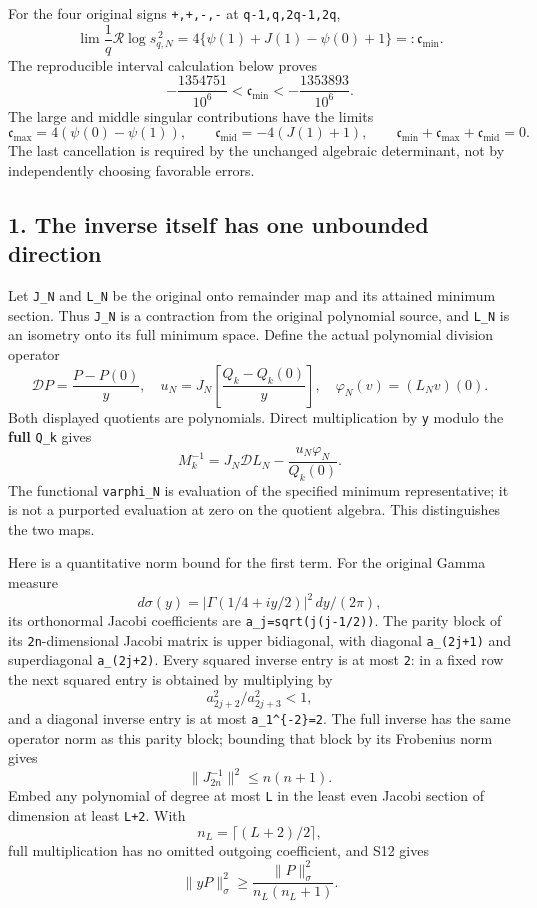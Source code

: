 \documentclass[11pt]{article}
\begin{document}
For the four original signs \texttt{+,+,-,-} at \texttt{q-1,q,2q-1,2q}, \[
 \boxed{\lim\frac1q\mathcal R\log s_{q,N}^{\,2}
 =4\{\psi(1)+J(1)-\psi(0)+1\}=:\mathfrak c_{\min}.}                 \tag{S8}
\] The reproducible interval calculation below proves \[
 -\frac{1354751}{10^6}<\mathfrak c_{\min}
 < -\frac{1353893}{10^6}.                                          \tag{S9}
\] The large and middle singular contributions have the limits \[
 \mathfrak c_{\max}=4(\psi(0)-\psi(1)),\qquad
 \mathfrak c_{\mathrm{mid}}=-4(J(1)+1),\qquad
 \mathfrak c_{\min}+\mathfrak c_{\max}+\mathfrak c_{\mathrm{mid}}=0.   \tag{S10}
\] The last cancellation is required by the unchanged algebraic determinant, not by independently choosing favorable errors.

\subsection{1. The inverse itself has one unbounded direction}\label{the-inverse-itself-has-one-unbounded-direction}

Let \texttt{J\_N} and \texttt{L\_N} be the original onto remainder map and its attained minimum section. Thus \texttt{J\_N} is a contraction from the original polynomial source, and \texttt{L\_N} is an isometry onto its full minimum space. Define the actual polynomial division operator \[
 \mathscr D P=\frac{P-P(0)}y,
 \quad u_N=J_N\left[\frac{Q_k-Q_k(0)}y\right],\quad
 \varphi_N(v)=(L_Nv)(0).
\] Both displayed quotients are polynomials. Direct multiplication by \texttt{y} modulo the \textbf{full} \texttt{Q\_k} gives \[
 \boxed{M_k^{-1}=J_N\mathscr D L_N-\frac{u_N\varphi_N}{Q_k(0)}.}     \tag{S11}
\] The functional \texttt{varphi\_N} is evaluation of the specified minimum representative; it is not a purported evaluation at zero on the quotient algebra. This distinguishes the two maps.

Here is a quantitative norm bound for the first term. For the original Gamma measure \[
 d\sigma(y)=|\Gamma(1/4+iy/2)|^2\,dy/(2\pi),
\] its orthonormal Jacobi coefficients are \nolinkurl{a_j=sqrt(j(j-1/2))}. The parity block of its \texttt{2n}-dimensional Jacobi matrix is upper bidiagonal, with diagonal \texttt{a\_(2j+1)} and superdiagonal \texttt{a\_(2j+2)}. Every squared inverse entry is at most \texttt{2}: in a fixed row the next squared entry is obtained by multiplying by \[
 a_{2j+2}^2/a_{2j+3}^2<1,
\] and a diagonal inverse entry is at most \texttt{a\_1\^{}\{-2\}=2}. The full inverse has the same operator norm as this parity block; bounding that block by its Frobenius norm gives \[
 \|J_{2n}^{-1}\|^2\le n(n+1).                                     \tag{S12}
\] Embed any polynomial of degree at most \texttt{L} in the least even Jacobi section of dimension at least \texttt{L+2}. With \[
 n_L=\lceil(L+2)/2\rceil,
\] full multiplication has no omitted outgoing coefficient, and S12 gives \[
 \|yP\|_\sigma^2\ge\frac{\|P\|_\sigma^2}{n_L(n_L+1)}.             \tag{S13}
\]
\end{document}
